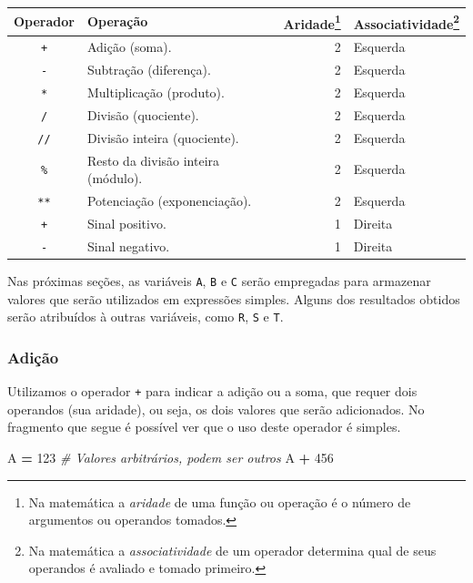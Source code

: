 \documentclass[
]{book}
\newenvironment{Shaded}{\begin{snugshade}}{\end{snugshade}}
\newcommand{\CommentTok}[1]{\textcolor[rgb]{0.56,0.35,0.01}{\textit{#1}}}
\newcommand{\DecValTok}[1]{\textcolor[rgb]{0.00,0.00,0.81}{#1}}
\newcommand{\NormalTok}[1]{#1}
\newcommand{\OperatorTok}[1]{\textcolor[rgb]{0.81,0.36,0.00}{\textbf{#1}}}
\begin{document}
\begin{longtable}[]{@{}clrl@{}}
\toprule
Operador & Operação & Aridade\footnote{Na matemática a \emph{aridade} de uma função ou operação é o número de argumentos ou operandos tomados.} & Associatividade\footnote{Na matemática a \emph{associatividade} de um operador determina qual de seus operandos é avaliado e tomado primeiro.} \\
\midrule
\endhead
\texttt{+} & Adição (soma). & 2 & Esquerda \\
\texttt{-} & Subtração (diferença). & 2 & Esquerda \\
\texttt{*} & Multiplicação (produto). & 2 & Esquerda \\
\texttt{/} & Divisão (quociente). & 2 & Esquerda \\
\texttt{//} & Divisão inteira (quociente). & 2 & Esquerda \\
\texttt{\%} & Resto da divisão inteira (módulo). & 2 & Esquerda \\
\texttt{**} & Potenciação (exponenciação). & 2 & Esquerda \\
\texttt{+} & Sinal positivo. & 1 & Direita \\
\texttt{-} & Sinal negativo. & 1 & Direita \\
\bottomrule
\end{longtable}

Nas próximas seções, as variáveis \texttt{A}, \texttt{B} e \texttt{C} serão empregadas para armazenar valores que serão utilizados em expressões simples. Alguns dos resultados obtidos serão atribuídos à outras variáveis, como \texttt{R}, \texttt{S} e \texttt{T}.

\hypertarget{adiuxe7uxe3o}{%
\subsubsection{Adição}\label{adiuxe7uxe3o}}

Utilizamos o operador \texttt{+} para indicar a adição ou a soma, que requer dois operandos (sua aridade), ou seja, os dois valores que serão adicionados. No fragmento que segue é possível ver que o uso deste operador é simples.

\begin{Shaded}
\begin{Highlighting}[]
\NormalTok{A }\OperatorTok{=} \DecValTok{123} \CommentTok{\# Valores arbitrários, podem ser outros}
\NormalTok{A }\OperatorTok{+} \DecValTok{456}
\end{Highlighting}
\end{Shaded}
\end{document}
